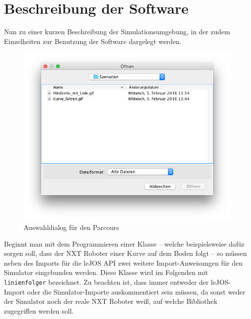 \documentclass[paper=a4, DIV=calc, BCOR=12mm, twoside=on, onecolumn=on, open = right, titlepage =on, parskip =half-, headsepline = on, footsepline = off, chapterprefix = off, appendixprefix = on, fontsize = 12pt, numbers = noenddot, abstract = on]{scrbook}
\begin{document}
\par \singlespacing
\section{Beschreibung der Software}
\onehalfspacing

Nun zu einer kurzen Beschreibung der Simulationsumgebung, in der zudem Einzelheiten zur Benutzung der Software dargelegt werden.



\begin{figure}[htb]
\centering
\includegraphics[width=\textwidth]{images/dialog_szenarien.png} 
\caption{Auswahldialog für den Parcours}
\label{fig:auswahldialog}
\end{figure}

Beginnt man mit dem Programmieren einer Klasse -- welche beispielsweise dafür sorgen soll, dass der NXT Roboter einer Kurve auf dem Boden folgt -- so müssen neben des Imports für die leJOS API zwei weitere Import-Anweisungen für den Simulator eingebunden werden. Diese Klasse wird im Folgenden mit \texttt{linienfolger} bezeichnet.
Zu beachten ist, dass immer entweder der leJOS-Import oder die Simulator-Importe auskommentiert sein müssen, da sonst weder der Simulator noch der reale NXT Roboter weiß, auf welche Bibliothek zugegriffen werden soll.
\end{document}
